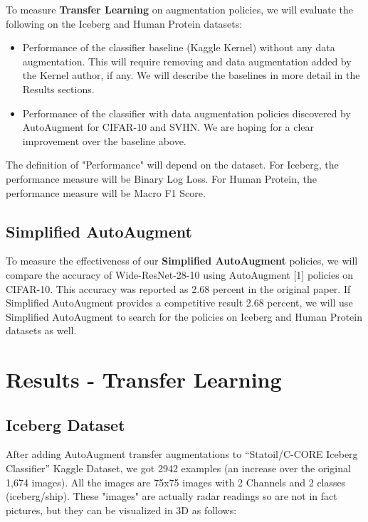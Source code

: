 \documentclass[10pt,twocolumn,letterpaper]{article}
\begin{document}
To measure \textbf{Transfer Learning} on augmentation policies, we will evaluate the following on the Iceberg and Human Protein datasets:

\begin{itemize}
  \item Performance of the classifier baseline (Kaggle Kernel) without any data augmentation.  This will require removing and data augmentation added by the Kernel author, if any.  We will describe the baselines in more detail in the Results sections.
  \item Performance of the classifier with data augmentation policies discovered by AutoAugment for CIFAR-10 and SVHN.  We are hoping for a clear improvement over the baseline above.
\end{itemize}

The definition of "Performance" will depend on the dataset.  For Iceberg, the performance measure will be Binary Log Loss.  For Human Protein, the performance measure will be Macro F1 Score.

\subsection{Simplified AutoAugment}

To measure the effectiveness of our \textbf{Simplified AutoAugment} policies, we will compare the accuracy of Wide-ResNet-28-10 using AutoAugment [1] policies on CIFAR-10.  This accuracy was reported as 2.68 percent in the original paper.  If Simplified AutoAugment provides a competitive result 2.68 percent, we will use Simplified AutoAugment to search for the policies on Iceberg and Human Protein datasets as well.



\section{Results - Transfer Learning}

\subsection{Iceberg Dataset}

After adding AutoAugment transfer augmentations to “Statoil/C-CORE Iceberg Classifier” Kaggle Dataset, we got 2942 examples (an increase over the original 1,674 images). All the images are 75x75 images with 2 Channels and 2 classes (iceberg/ship).  These "images" are actually radar readings so are not in fact pictures,  but they can be visualized in 3D as follows:
\end{document}
